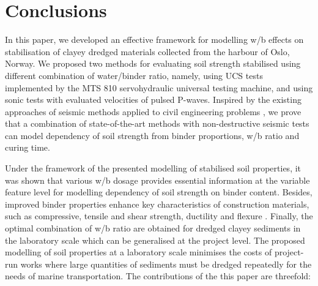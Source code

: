 \documentclass[information,article,submit,pdftex,moreauthors]{Definitions/mdpi}
\begin{document}
\section{Conclusions}

In this paper, we developed an effective framework for modelling w/b effects on stabilisation of clayey dredged materials collected from the harbour of Oslo, Norway. We proposed two methods for evaluating soil strength stabilised using different combination of water/binder ratio, namely, using UCS tests implemented by the MTS 810 servohydraulic universal testing machine, and using sonic tests with evaluated velocities of pulsed P-waves. Inspired by the existing approaches of seismic methods applied to civil engineering problems \cite{app13042745,HARRYPERSADDANIEL2022104557}, we prove that a combination of state-of-the-art methods with non-destructive seismic tests can   model dependency of soil strength from binder proportions, w/b ratio and curing time. 

Under the framework of the presented modelling of stabilised soil properties, it was shown that various w/b dosage provides essential information at the variable feature level for modelling dependency of soil strength on binder content. Besides, improved binder properties enhance key characteristics of construction materials, such as compressive, tensile and shear strength, ductility and flexure \cite{Reddy2022,Maheretal2008,MaherHo1994}. Finally, the optimal combination of w/b ratio are obtained for dredged clayey sediments in the laboratory scale which can be generalised at the project level. The proposed modelling of soil properties at a laboratory scale minimises the costs of project-run works where large quantities of sediments must be dredged repeatedly for the needs of marine transportation. The contributions of the this paper are threefold:
\end{document}
